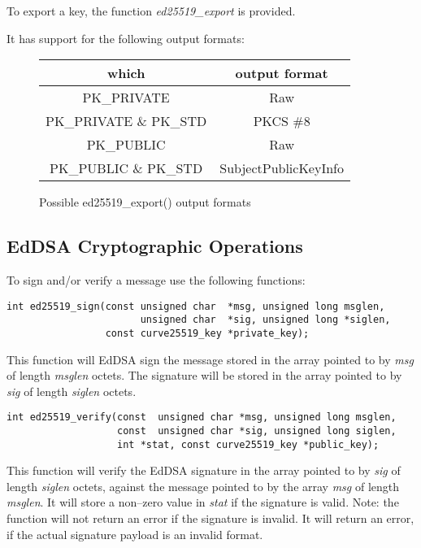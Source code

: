 \documentclass[synpaper]{book}
\begin{document}
To export a key, the function \textit{ed25519\_export} is provided.

It has support for the following output formats:

\begin{figure}[H]
\begin{center}
\begin{tabular}{|c|c|}
\hline \textbf{which} & \textbf{output format} \\
\hline PK\_PRIVATE & Raw \\
\hline PK\_PRIVATE \& PK\_STD & PKCS \#8 \\
\hline PK\_PUBLIC & Raw \\
\hline PK\_PUBLIC \& PK\_STD & SubjectPublicKeyInfo \\
\hline
\end{tabular}
\end{center}
\caption{Possible ed25519\_export() output formats}
\end{figure}

\subsection{EdDSA Cryptographic Operations}

To sign and/or verify a message use the following functions:

\begin{verbatim}
int ed25519_sign(const unsigned char  *msg, unsigned long msglen,
                       unsigned char  *sig, unsigned long *siglen,
                 const curve25519_key *private_key);
\end{verbatim}

This function will EdDSA sign the message stored in the array pointed to by \textit{msg} of length \textit{msglen} octets.  The signature
will be stored in the array pointed to by \textit{sig} of length \textit{siglen} octets.

\begin{verbatim}
int ed25519_verify(const  unsigned char *msg, unsigned long msglen,
                   const  unsigned char *sig, unsigned long siglen,
                   int *stat, const curve25519_key *public_key);
\end{verbatim}

This function will verify the EdDSA signature in the array pointed to by \textit{sig} of length \textit{siglen} octets, against the message
pointed to by the array \textit{msg} of length \textit{msglen}. It will store a non--zero value in \textit{stat} if the signature is valid.  Note:
the function will not return an error if the signature is invalid. It will return an error, if the actual signature payload is an invalid format.
\end{document}
